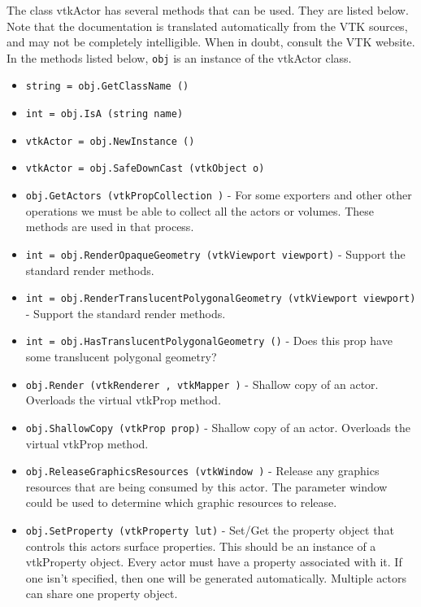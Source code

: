 The class vtkActor has several methods that can be used.
  They are listed below.
Note that the documentation is translated automatically from the VTK sources,
and may not be completely intelligible.  When in doubt, consult the VTK website.
In the methods listed below, \verb|obj| is an instance of the vtkActor class.
\begin{itemize}
\item  \verb|string = obj.GetClassName ()|

\item  \verb|int = obj.IsA (string name)|

\item  \verb|vtkActor = obj.NewInstance ()|

\item  \verb|vtkActor = obj.SafeDownCast (vtkObject o)|

\item  \verb|obj.GetActors (vtkPropCollection )| -  For some exporters and other other operations we must be
 able to collect all the actors or volumes. These methods
 are used in that process.

\item  \verb|int = obj.RenderOpaqueGeometry (vtkViewport viewport)| -  Support the standard render methods.

\item  \verb|int = obj.RenderTranslucentPolygonalGeometry (vtkViewport viewport)| -  Support the standard render methods.

\item  \verb|int = obj.HasTranslucentPolygonalGeometry ()| -  Does this prop have some translucent polygonal geometry?

\item  \verb|obj.Render (vtkRenderer , vtkMapper )| -  Shallow copy of an actor. Overloads the virtual vtkProp method.

\item  \verb|obj.ShallowCopy (vtkProp prop)| -  Shallow copy of an actor. Overloads the virtual vtkProp method.

\item  \verb|obj.ReleaseGraphicsResources (vtkWindow )| -  Release any graphics resources that are being consumed by this actor.
 The parameter window could be used to determine which graphic
 resources to release.

\item  \verb|obj.SetProperty (vtkProperty lut)| -  Set/Get the property object that controls this actors surface
 properties.  This should be an instance of a vtkProperty object.  Every
 actor must have a property associated with it.  If one isn't specified,
 then one will be generated automatically. Multiple actors can share one
 property object.


\end{itemize}
